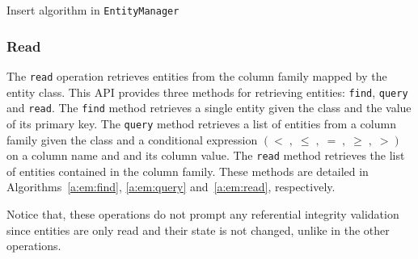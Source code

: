 		 
		
		 \begin{algorithm}
		 	\caption{Insert algorithm in \texttt{EntityManager}}\label{a:em:insert}
			 
			
		 \end{algorithm}
			
		\subsubsection{Read}
		The  \texttt{read} operation retrieves  entities from the column family mapped
		by the entity class.		
		This \ac{API} provides three methods for retrieving entities: \texttt{find},
		\texttt{query} and \texttt{read}. The \texttt{find} method retrieves a single
		entity given the class and the value of its primary key. The \texttt{query}
		method retrieves a list of entities from a column family given the class and a
		conditional expression $\left(< \;,\; \leq\;,\;=\;,\;\geq\;,\; > \right)$ on a
		column name and and its column value. The \texttt{read}  method retrieves
		 the list of entities contained in the column family. These methods are
		 detailed in Algorithms~\ref{a:em:find}, \ref{a:em:query} and~\ref{a:em:read},
		 respectively.  
		 
		 Notice that, these   operations do not prompt any referential
		  integrity validation since entities are only read and their state is not
		 changed,  unlike in the other operations.
		  
